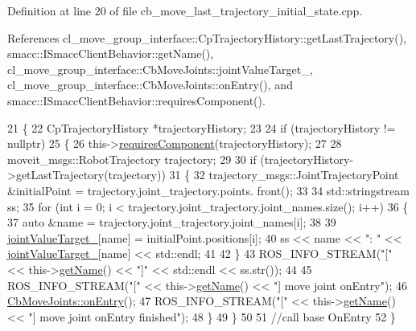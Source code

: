 Definition at line 20 of file cb\+\_\+move\+\_\+last\+\_\+trajectory\+\_\+initial\+\_\+state.\+cpp.



References cl\+\_\+move\+\_\+group\+\_\+interface\+::\+Cp\+Trajectory\+History\+::get\+Last\+Trajectory(), smacc\+::\+I\+Smacc\+Client\+Behavior\+::get\+Name(), cl\+\_\+move\+\_\+group\+\_\+interface\+::\+Cb\+Move\+Joints\+::joint\+Value\+Target\+\_\+, cl\+\_\+move\+\_\+group\+\_\+interface\+::\+Cb\+Move\+Joints\+::on\+Entry(), and smacc\+::\+I\+Smacc\+Client\+Behavior\+::requires\+Component().


\begin{DoxyCode}
21     \{
22         CpTrajectoryHistory *trajectoryHistory;
23 
24         \textcolor{keywordflow}{if} (trajectoryHistory != \textcolor{keyword}{nullptr})
25         \{
26             this->\hyperlink{classsmacc_1_1ISmaccClientBehavior_a19c6d658c8e809bb93bfdc9b639a3ac3}{requiresComponent}(trajectoryHistory);
27 
28             moveit\_msgs::RobotTrajectory trajectory;
29 
30             \textcolor{keywordflow}{if} (trajectoryHistory->getLastTrajectory(trajectory))
31             \{
32                 trajectory\_msgs::JointTrajectoryPoint &initialPoint = trajectory.joint\_trajectory.points.
      front();
33 
34                 std::stringstream ss;
35                 \textcolor{keywordflow}{for} (\textcolor{keywordtype}{int} i = 0; i < trajectory.joint\_trajectory.joint\_names.size(); i++)
36                 \{
37                     \textcolor{keyword}{auto} &name = trajectory.joint\_trajectory.joint\_names[i];
38 
39                     \hyperlink{classcl__move__group__interface_1_1CbMoveJoints_a8103f7c923a34d9bf5a2c374ff88a277}{jointValueTarget\_}[name] = initialPoint.positions[i];
40                     ss << name << \textcolor{stringliteral}{": "} << \hyperlink{classcl__move__group__interface_1_1CbMoveJoints_a8103f7c923a34d9bf5a2c374ff88a277}{jointValueTarget\_}[name] << std::endl;
41                     
42                 \}
43                 ROS\_INFO\_STREAM(\textcolor{stringliteral}{"["} << this->\hyperlink{classsmacc_1_1ISmaccClientBehavior_a18e4bec9460b010f2894c0f7e7064a34}{getName}() << \textcolor{stringliteral}{"]"} << std::endl << ss.str());
44 
45                 ROS\_INFO\_STREAM(\textcolor{stringliteral}{"["} << this->\hyperlink{classsmacc_1_1ISmaccClientBehavior_a18e4bec9460b010f2894c0f7e7064a34}{getName}() << \textcolor{stringliteral}{"] move joint onEntry"});
46                 \hyperlink{classcl__move__group__interface_1_1CbMoveJoints_a23e4181af695aed9fa6bb4ae3f17fd76}{CbMoveJoints::onEntry}();
47                 ROS\_INFO\_STREAM(\textcolor{stringliteral}{"["} << this->\hyperlink{classsmacc_1_1ISmaccClientBehavior_a18e4bec9460b010f2894c0f7e7064a34}{getName}() << \textcolor{stringliteral}{"] move joint onEntry finished"});
48             \}
49         \}
50 
51         \textcolor{comment}{//call base OnEntry}
52     \}
\end{DoxyCode}
